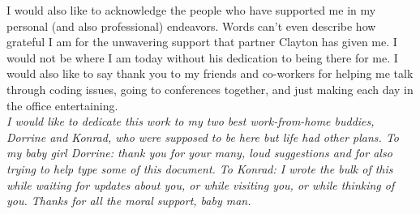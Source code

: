 I would also like to acknowledge the people who have supported me in my personal (and also professional) endeavors. Words can't even describe how grateful I am for the unwavering support that partner Clayton has given me. I would not be where I am today without his dedication to being there for me. I would also like to say thank you to my friends and co-workers for helping me talk through coding issues, going to conferences together, and just making each day in the office entertaining. \\


\noindent \textit{I would like to dedicate this work to my two best work-from-home buddies, Dorrine and Konrad, who were supposed to be here but life had other plans. To my baby girl Dorrine: thank you for your many, loud suggestions and for also trying to help type some of this document. To Konrad: I wrote the bulk of this while waiting for updates about you, or while visiting you, or while thinking of you. Thanks for all the moral support, baby man.}